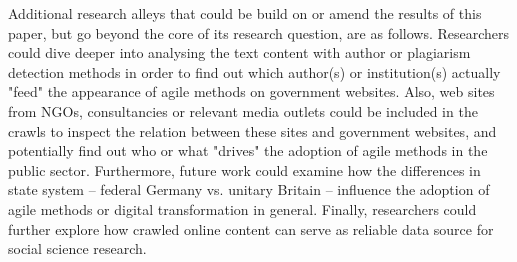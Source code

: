Additional research alleys that could be build on or amend the results of this paper, but go beyond the core of its research question, are as follows. Researchers could dive deeper into analysing the text content with author or plagiarism detection methods in order to find out which author(s) or institution(s) actually "feed" the appearance of agile methods on government websites. Also, web sites from NGOs, consultancies or relevant media outlets could be included in the crawls to inspect the relation between these sites and government websites, and potentially find out who or what "drives" the adoption of agile methods in the public sector. Furthermore, future work could examine how the differences in state system – federal Germany vs. unitary Britain – influence the adoption of agile methods or digital transformation in general. Finally, researchers could further explore how crawled online content can serve as reliable data source for social science research.